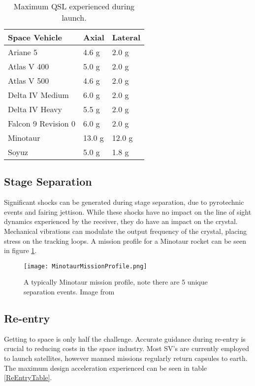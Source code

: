 \begin{table}[!htb]
\centering
\begin{tabular}{|l|l|l|}
\hline
Space Vehicle       & Axial                   & Lateral              \\ \hline
Ariane 5            & 4.6 g \cite{Ariane}     & 2.0 g \cite{Ariane}  \\ \hline
Atlas V 400         & 5.0 g \cite{AtlasV}     & 2.0 g \cite{AtlasV}  \\ \hline
Atlas V 500         & 4.6 g \cite{AtlasV}     & 2.0 g \cite{AtlasV}  \\ \hline
Delta IV Medium     & 6.0 g \cite{DeltaIV}    & 2.0 g \cite{DeltaIV} \\ \hline
Delta IV Heavy      & 5.5 g \cite{DeltaIV}    & 2.0 g \cite{DeltaIV} \\ \hline
Falcon 9 Revision 0 & 6.0 g \cite{Falcon9}    & 2.0 g \cite{Falcon9} \\ \hline
Minotaur            & 13.0 g  \cite{Minotaur} & 12.0 g \cite{Minotaur} \\ \hline
Soyuz               & 5.0 g \cite{Soyuz}      & 1.8 g \cite{Soyuz}   \\ \hline
\end{tabular}
\caption{Maximum \ac{QSL} experienced during launch.}
\label{QSLTable}
\end{table}

\subsection{Stage Separation}

Significant shocks can be generated during stage separation, due to pyrotechnic events and fairing jettison\cite{AtlasV,Ariane,DeltaIV}. While these shocks have no impact on the line of sight dynamics experienced by the receiver, they do have an impact on the crystal. Mechanical vibrations can modulate the output frequency of the crystal, placing stress on the tracking loops. A mission profile for a Minotaur rocket can be seen in figure \ref{fig:MinotaurMissionProfile}.


\begin{figure}[!htb] 
    \centering
    \texttt{[image: MinotaurMissionProfile.png]} 
    \caption{A typically Minotaur mission profile, note there are 5 unique separation events. Image from \cite{Minotaur}}
    \label{fig:MinotaurMissionProfile}
\end{figure}

\subsection{Re-entry}
Getting to space is only half the challenge. Accurate guidance during re-entry is crucial to reducing costs in the space industry. Most \ac{SV}'s are currently employed to launch satellites, however manned missions regularly return capsules to earth. The maximum design acceleration experienced can be seen in table \ref{ReEntryTable}. 

